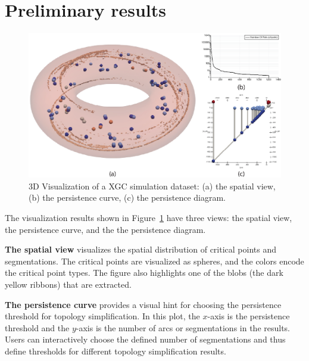 \section{Preliminary results}
\label{sec:results}

\begin{figure}
  \centering
  \includegraphics[width=\linewidth]{Figs/simplification3D}
  \caption{3D Visualization of a XGC simulation dataset: (a) the spatial view, (b) the persistence curve, (c) the persistence diagram.}
  \label{fig:results}
\end{figure}



The visualization results shown in Figure~\ref{fig:results} have three views: the spatial view, the persistence curve, and the the persistence diagram.  

{\bf The spatial view} visualizes the spatial distribution of critical points and segmentations.  The critical points are visualized as spheres, and the colors encode the critical point types.  The figure also highlights one of the blobs (the dark yellow ribbons) that are extracted. 

{\bf The persistence curve} provides a visual hint for choosing the persistence threshold for topology simplification.  In this plot, the $x$-axis is the persistence threshold and the $y$-axis is the number of arcs or segmentations in the results.  Users can interactively choose the defined number of segmentations and thus define thresholds for different topology simplification results.  

